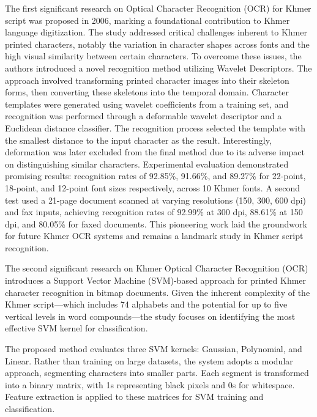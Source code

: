 \citet{CheyFirstOCR} The first significant research on Optical Character Recognition (OCR) 
for Khmer script was proposed in 2006, marking a foundational contribution 
to Khmer language digitization. The study addressed critical challenges 
inherent to Khmer printed characters, notably the variation in character 
shapes across fonts and the high visual similarity between certain 
characters. To overcome these issues, the authors introduced a novel 
recognition method utilizing Wavelet Descriptors. The approach involved 
transforming printed character images into their skeleton forms, 
then converting these skeletons into the temporal domain. Character 
templates were generated using wavelet coefficients from a training set, 
and recognition was performed through a deformable wavelet descriptor 
and a Euclidean distance classifier. The recognition process selected 
the template with the smallest distance to the input character as the 
result. Interestingly, deformation was later excluded from the final 
method due to its adverse impact on distinguishing similar characters. 
Experimental evaluation demonstrated promising results: recognition 
rates of 92.85\%, 91.66\%, and 89.27\% for 22-point, 18-point, and 
12-point font sizes respectively, across 10 Khmer fonts. A second 
test used a 21-page document scanned at varying resolutions 
(150, 300, 600 dpi) and fax inputs, achieving recognition rates 
of 92.99\% at 300 dpi, 88.61\% at 150 dpi, and 80.05\% for faxed documents. 
This pioneering work laid the groundwork for future Khmer OCR systems 
and remains a landmark study in Khmer script recognition.

\citet{Sok&Taing2014} The second significant research on 
Khmer Optical Character Recognition (OCR) introduces a Support 
Vector Machine (SVM)-based approach for printed Khmer character 
recognition in bitmap documents. Given the inherent complexity 
of the Khmer script—which includes 74 alphabets and the potential 
for up to five vertical levels in word compounds—the study focuses 
on identifying the most effective SVM kernel for classification.

The proposed method evaluates three SVM kernels: Gaussian, Polynomial, 
and Linear. Rather than training on large datasets, the system adopts 
a modular approach, segmenting characters into smaller parts. Each 
segment is transformed into a binary matrix, with 1s representing 
black pixels and 0s for whitespace. Feature extraction is applied 
to these matrices for SVM training and classification.

